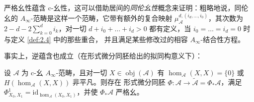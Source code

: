 严格幺性蕴含 c-幺性，这可以借助居间的\emph{同伦幺性}概念来证明：粗略地说，同伦幺的
$A_\infty$-范畴是这样一个范畴，它带有额外的复合映射
$\mu^{d,(i_d,\dots,i_0)}_{\mathcal A}$，其次数为 $2-d-2\sum_{k=0}^d i_k$，对一切
$d+i_0+\dots+i_d>0$ 都有定义，当 $i_0=\dots=i_d=0$ 时与定义 \ref{def:2.4} 中的那些重合，
并且满足某些修改过的相容 $A_\infty$-结合性方程。

事实上，逆蕴含也成立（在形式微分同胚给出的拟同构意义下）：

\begin{Lem}\label{lem:2.24}
设 $\mathcal A$ 为 c-幺 $A_\infty$-范畴，且对一切 $X\in\operatorname{obj}(\mathcal A)$
有 $\hom_{\mathcal A}(X,X)=\{0\}$ 或 $H(\hom_{\mathcal A}(X,X))$ 非平凡。则存在
形式微分同胚 $\Phi:\mathcal A\to\tilde{\mathcal A}=\Phi_*\mathcal A$，满足
$\Phi^1_{X_0,X_1}=\mathrm{id}_{\hom_{\mathcal A}(X_0,X_1)}$，并使
$\Phi_*\mathcal A$ 严格幺。
\end{Lem}

